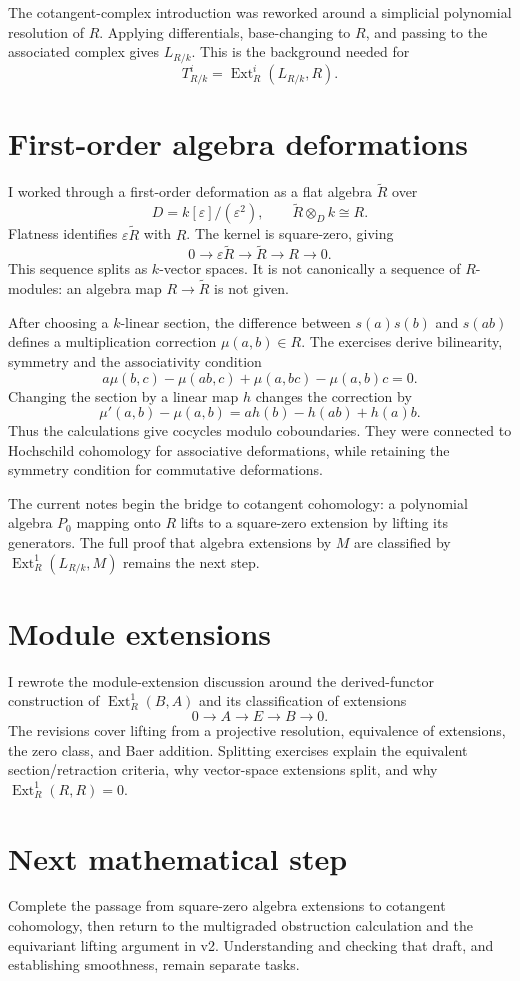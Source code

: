 \documentclass[11pt]{article}
\begin{document}
The cotangent-complex introduction was
reworked around a simplicial polynomial
resolution of $R$. Applying differentials,
base-changing to $R$, and passing to the
associated complex gives $L_{R/k}$. This is
the background needed for
$$
T^i_{R/k}
=\operatorname{Ext}^i_R(L_{R/k},R).
$$

\section*{First-order algebra deformations}

I worked through a first-order deformation
as a flat algebra $\widetilde R$ over
$$
D=k[\varepsilon]/(\varepsilon^2),
\qquad
\widetilde R\otimes_D k\cong R.
$$
Flatness identifies
$\varepsilon\widetilde R$ with $R$.
The kernel is square-zero, giving
$$
0\longrightarrow\varepsilon\widetilde R
\longrightarrow\widetilde R
\longrightarrow R\longrightarrow0.
$$
This sequence splits as $k$-vector spaces.
It is not canonically a sequence of
$R$-modules: an algebra map
$R\to\widetilde R$ is not given.

After choosing a $k$-linear section, the
difference between $s(a)s(b)$ and $s(ab)$
defines a multiplication correction
$\mu(a,b)\in R$. The exercises derive
bilinearity, symmetry and the associativity
condition
$$
a\mu(b,c)-\mu(ab,c)
+\mu(a,bc)-\mu(a,b)c=0.
$$
Changing the section by a linear map $h$
changes the correction by
$$
\mu'(a,b)-\mu(a,b)
=a h(b)-h(ab)+h(a)b.
$$
Thus the calculations give cocycles modulo
coboundaries. They were connected to
Hochschild cohomology for associative
deformations, while retaining the symmetry
condition for commutative deformations.

The current notes begin the bridge to
cotangent cohomology: a polynomial algebra
$P_0$ mapping onto $R$ lifts to a square-zero
extension by lifting its generators.
The full proof that algebra extensions by
$M$ are classified by
$\operatorname{Ext}^1_R(L_{R/k},M)$ remains
the next step.

\section*{Module extensions}

I rewrote the module-extension discussion
around the derived-functor construction of
$\operatorname{Ext}^1_R(B,A)$ and its
classification of extensions
$$
0\longrightarrow A\longrightarrow E
\longrightarrow B\longrightarrow0.
$$
The revisions cover lifting from a projective
resolution, equivalence of extensions,
the zero class, and Baer addition.
Splitting exercises explain the equivalent
section/retraction criteria, why vector-space
extensions split, and why
$\operatorname{Ext}^1_R(R,R)=0$.

\section*{Next mathematical step}

Complete the passage from square-zero
algebra extensions to cotangent cohomology,
then return to the multigraded obstruction
calculation and the equivariant lifting
argument in v2. Understanding and checking
that draft, and establishing smoothness,
remain separate tasks.
\end{document}
